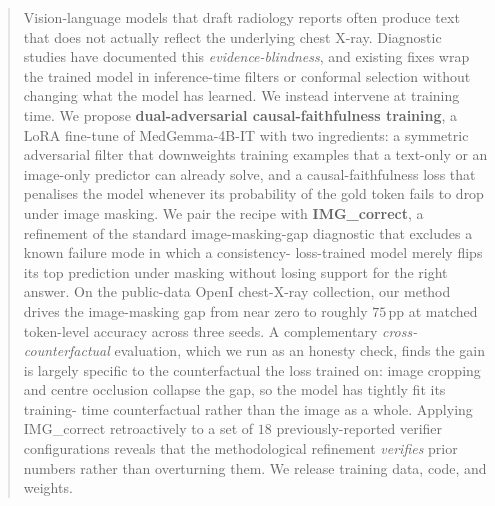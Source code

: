 \documentclass{article}
\begin{document}

\printAffiliationsAndNotice{}

\begin{abstract}
Vision-language models that draft radiology reports often produce text
that does not actually reflect the underlying chest X-ray. Diagnostic
studies have documented this \emph{evidence-blindness}, and existing
fixes wrap the trained model in inference-time filters or conformal
selection without changing what the model has learned. We instead
intervene at training time. We propose
\textbf{dual-adversarial causal-faithfulness training}, a LoRA fine-tune
of MedGemma-4B-IT with two ingredients: a symmetric adversarial filter
that downweights training examples that a text-only or an image-only
predictor can already solve, and a causal-faithfulness loss that
penalises the model whenever its probability of the gold token fails
to drop under image masking. We pair the recipe with
\textbf{IMG\_correct}, a refinement of the standard image-masking-gap
diagnostic that excludes a known failure mode in which a consistency-
loss-trained model merely flips its top prediction under masking
without losing support for the right answer. On the public-data OpenI
chest-X-ray collection, our method drives the image-masking gap from
near zero to roughly $75$\,pp at matched token-level accuracy across
three seeds. A complementary \emph{cross-counterfactual} evaluation,
which we run as an honesty check, finds the gain is largely specific to
the counterfactual the loss trained on: image cropping and centre
occlusion collapse the gap, so the model has tightly fit its training-
time counterfactual rather than the image as a whole. Applying
IMG\_correct retroactively to a set of $18$ previously-reported
verifier configurations reveals that the methodological refinement
\emph{verifies} prior numbers rather than overturning them. We release
training data, code, and weights.
\end{abstract}
\end{document}
